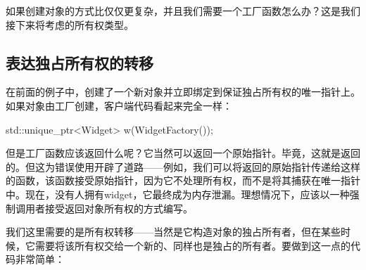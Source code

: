 如果创建对象的方式比仅仅更复杂，并且我们需要一个工厂函数怎么办？这是我们接下来将考虑的所有权类型。

\subsection{表达独占所有权的转移}

在前面的例子中，创建了一个新对象并立即绑定到保证独占所有权的唯一指针上。如果对象由工厂创建，客户端代码看起来完全一样：

\begin{code}
std::unique_ptr<Widget> w(WidgetFactory());
\end{code}

但是工厂函数应该返回什么呢？它当然可以返回一个原始指针。毕竟，这就是返回的。但这为错误使用开辟了道路——例如，我们可以将返回的原始指针传递给这样的函数，该函数接受原始指针，因为它不处理所有权，而不是将其捕获在唯一指针中。现在，没有人拥有widget，它最终成为内存泄漏。理想情况下，应该以一种强制调用者接受返回对象所有权的方式编写。

我们这里需要的是所有权转移——当然是它构造对象的独占所有者，但在某些时候，它需要将该所有权交给一个新的、同样也是独占的所有者。要做到这一点的代码非常简单：

